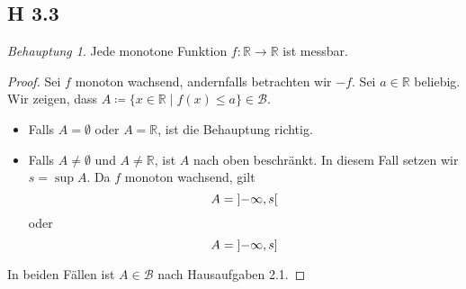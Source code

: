 \documentclass[fleqn,draft,a5paper]{article}
\theoremstyle{remark}
\newtheorem*{Behauptung}{Behauptung}
\begin{document}
\subsection{H 3.3}
\begin{Behauptung}
    Jede monotone Funktion \(f: \mathbb{R} \to \mathbb{R}\) ist messbar.
\end{Behauptung}

\begin{proof}
    Sei \(f\) monoton wachsend, andernfalls betrachten wir \(-f\).
    Sei \( a \in \mathbb{R}\) beliebig. Wir zeigen, dass \( A \coloneq \{ x \in \mathbb{R} \mid f(x) \leq a \} \in \mathcal{B}\).
    \begin{itemize} 
    \item Falls \(A = \emptyset \) oder \(A = \mathbb{R}\), ist die Behauptung richtig.
    \item Falls \(A \neq \emptyset \) und \(A \neq \mathbb{R}\), ist \(A\) nach oben beschränkt. In
      diesem Fall setzen wir \(s = \sup A\). Da \(f\) monoton wachsend,
      gilt \[ A = \ointerval{-\infty}{s} \] oder
        \[ A = \linterval{-\infty}{s} \]
    \end{itemize}
    In beiden Fällen ist \(A \in \mathcal{B}\) nach Hausaufgaben 2.1.
\end{proof}
\end{document}
